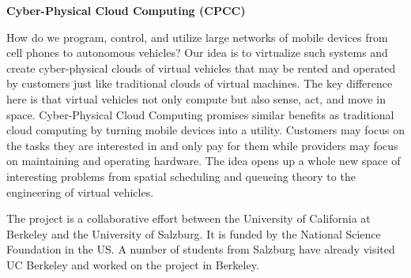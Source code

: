 {\bf{Cyber-Physical Cloud Computing (CPCC)}}

How do we program, control, and utilize large networks of mobile devices from cell phones to autonomous vehicles? Our idea is to virtualize such systems and create cyber-physical clouds of virtual vehicles that may be rented and operated by customers just like traditional clouds of virtual machines. The key difference here is that virtual vehicles not only compute but also sense, act, and move in space. Cyber-Physical Cloud Computing promises similar benefits as traditional cloud computing by turning mobile devices into a utility. Customers may focus on the tasks they are interested in and only pay for them while providers may focus on maintaining and operating hardware. The idea opens up a whole new space of interesting problems from spatial scheduling and queueing theory to the engineering of virtual vehicles.

The project is a collaborative effort between the University of California at Berkeley and the University of Salzburg. It is funded by the National Science Foundation in the US. A number of students from Salzburg have already visited UC Berkeley and worked on the project in Berkeley.